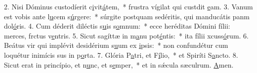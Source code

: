 2. Nisi Dóminus custodíerit c\uline{i}vit\uline{á}tem,~* frustra vígilat qui custdit \uline{e}am.
3. Vanum est vobis ante l\uline{u}cem s\uline{ú}rgere:~* súrgite postquam sedéritis, qui manducátis panm dol\uline{ó}ris.
4. Cum déderit diléctis s\uline{u}is s\uline{o}mnum:~* ecce heréditas Dómini fílii: merces, frctus v\uline{e}ntris.
5. Sicut sagíttæ in m\uline{a}nu pot\uline{é}ntis:~* ita fílii xcuss\uline{ó}rum.
6. Beátus vir qui implévit desidérium s\uline{u}um ex \uline{i}psis:~* non confundétur cum loquétur inimícis sus in p\uline{o}rta.
7. Glória P\uline{a}tri, et F\uline{í}lio,~* et Spiríti S\uline{a}ncto.
8. Sicut erat in princípio, et n\uline{u}nc, et s\uline{e}mper,~* et in sǽcula sæculrum. \uline{A}men.
